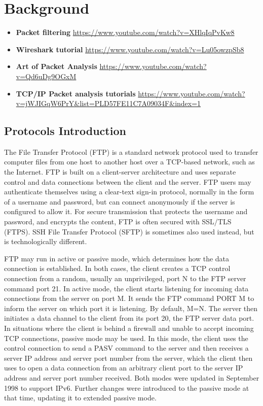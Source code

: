 \chapter{Background}
\begin{itemize}
\item {\bf Packet filtering}
\url{https://www.youtube.com/watch?v=XHlqIqPvKw8}
\item {\bf Wireshark tutorial}
\url{https://www.youtube.com/watch?v=Lu05owzpSb8}
\item {\bf Art of Packet Analysis}
\url{https://www.youtube.com/watch?v=Qd6uDg9OGxM}
\item {\bf TCP/IP Packet analysis tutorials}
\url{https://www.youtube.com/watch?v=jWJIGqW6PrY&list=PLD57FE11C7A09034F&index=1}
\end{itemize}

\section{Protocols Introduction}
The File Transfer Protocol (FTP) is a standard network protocol used
to transfer computer files from one host to another host over a
TCP-based network, such as the Internet.\cite{10} FTP is built on a
client-server architecture and uses separate control and data
connections between the client and the server. FTP users may
authenticate themselves using a clear-text sign-in protocol, normally
in the form of a username and password, but can connect anonymously if
the server is configured to allow it. For secure transmission that
protects the username and password, and encrypts the content, FTP is
often secured with SSL/TLS (FTPS). SSH File Transfer Protocol (SFTP)
is sometimes also used instead, but is technologically different.

FTP may run in active or passive mode, which determines how the data
connection is established.\cite{11} In both cases, the client creates a TCP
control connection from a random, usually an unprivileged, port N to
the FTP server command port 21. In active mode, the client starts
listening for incoming data connections from the server on port M. It
sends the FTP command PORT M to inform the server on which port it is
listening. By default, M=N. The server then initiates a data channel
to the client from its port 20, the FTP server data port. In
situations where the client is behind a firewall and unable to accept
incoming TCP connections, passive mode may be used. In this mode, the
client uses the control connection to send a PASV command to the
server and then receives a server IP address and server port number
from the server,\cite{11,12} which the client then uses to open a data
connection from an arbitrary client port to the server IP address and
server port number received.\cite{13} Both modes were updated in September
1998 to support IPv6. Further changes were introduced to the passive
mode at that time, updating it to extended passive mode.\cite{14}

